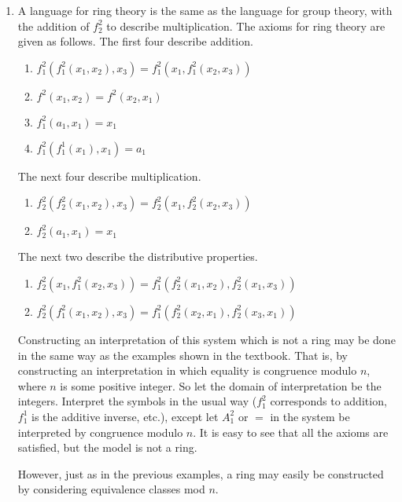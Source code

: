 \begin{enumerate}
  \item %
    A language for ring theory is the same as the language for group theory, with the addition of \(f^2_2\) to describe multiplication. The axioms for ring theory are given as follows. The first four describe addition.
    \begin{enumerate}
      \item \(f^2_1(f^2_1(x_1, x_2), x_3) = f^2_1(x_1, f^2_1(x_2, x_3))\)
      \item \(f^2(x_1, x_2) = f^2(x_2, x_1)\)
      \item \(f^2_1(a_1, x_1) = x_1\)
      \item \(f^2_1(f^1_1(x_1), x_1) = a_1\)
    \end{enumerate}
    The next four describe multiplication.
    \begin{enumerate}
      \item \(f^2_2(f^2_2(x_1, x_2), x_3) = f^2_2(x_1, f^2_2(x_2, x_3))\)
      \item \(f^2_2(a_1, x_1) = x_1\)
    \end{enumerate}
    The next two describe the distributive properties.
    \begin{enumerate}
      \item \(f^2_2(x_1, f^2_1(x_2, x_3)) = f^2_1(f^2_2(x_1, x_2), f^2_2(x_1, x_3))\)
      \item \(f^2_2(f^2_1(x_1, x_2), x_3) = f^2_1(f^2_2(x_2, x_1), f^2_2(x_3, x_1))\)
    \end{enumerate}
    Constructing an interpretation of this system which is not a ring may be done in the same way as the examples shown in the textbook. That is, by constructing an interpretation in which equality is congruence modulo \(n\), where \(n\) is some positive integer. So let the domain of interpretation be the integers. Interpret the symbols in the usual way (\(f^2_1\) corresponds to addition, \(f^1_1\) is the additive inverse, etc.), except let \(A^2_1\) or \(=\) in the system be interpreted by congruence modulo \(n\). It is easy to see that all the axioms are satisfied, but the model is not a ring.

    However, just as in the previous examples, a ring may easily be constructed by considering equivalence classes mod \(n\).


\end{enumerate}
